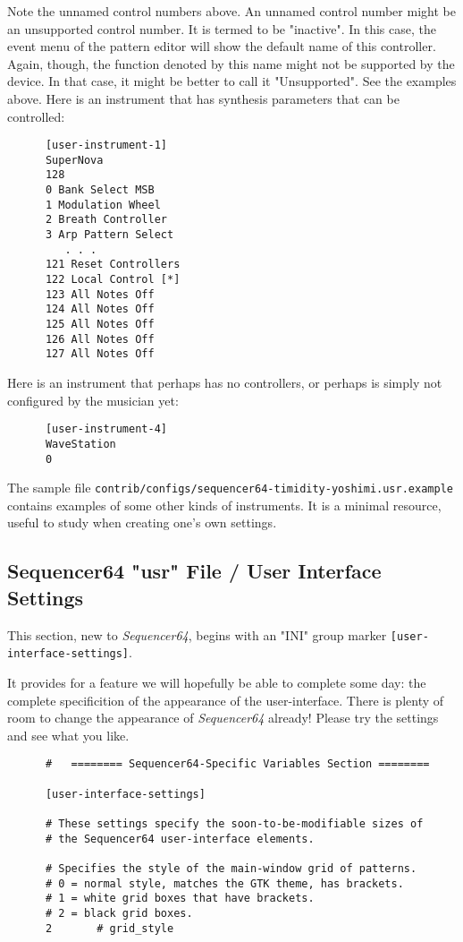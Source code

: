    Note the unnamed control numbers above.
   An unnamed control number might be an unsupported control number.
   It is termed to be "inactive".  In this case, the event menu of
   the pattern editor will show the default name of this controller.
   Again, though, the function denoted by this name might not be supported by
   the device.  In that case, it might be better to call it "Unsupported".
   See the examples above.
   Here is an instrument that has synthesis parameters that can be controlled:

   \begin{verbatim}
      [user-instrument-1]
      SuperNova
      128
      0 Bank Select MSB
      1 Modulation Wheel
      2 Breath Controller
      3 Arp Pattern Select
         . . .
      121 Reset Controllers
      122 Local Control [*]
      123 All Notes Off
      124 All Notes Off
      125 All Notes Off
      126 All Notes Off
      127 All Notes Off
   \end{verbatim}

   Here is an instrument that perhaps has no controllers, or perhaps is simply
   not configured by the musician yet:

   \begin{verbatim}
      [user-instrument-4]
      WaveStation
      0
   \end{verbatim}

   The sample file
   \texttt{contrib/configs/sequencer64-timidity-yoshimi.usr.example}
   contains examples of some other kinds of instruments.
   It is a minimal resource, useful to study when creating one's own settings.

\subsection{Sequencer64 "usr" File / User Interface Settings}
\label{subsec:seq64_usr_file_user_interface_settings}

   This section, new to \textsl{Sequencer64}, begins with an
   "INI" group marker \texttt{[user-interface-settings]}.

   It provides for a feature we will hopefully be able to complete some day:
   the complete specificition of the appearance of the user-interface.
   There is plenty of room to change the appearance of
   \textsl{Sequencer64} already!  Please try the settings and see what you
   like.

   \begin{verbatim}
      #   ======== Sequencer64-Specific Variables Section ========

      [user-interface-settings]

      # These settings specify the soon-to-be-modifiable sizes of
      # the Sequencer64 user-interface elements.

      # Specifies the style of the main-window grid of patterns.
      # 0 = normal style, matches the GTK theme, has brackets.
      # 1 = white grid boxes that have brackets.
      # 2 = black grid boxes.
      2       # grid_style
   \end{verbatim}

